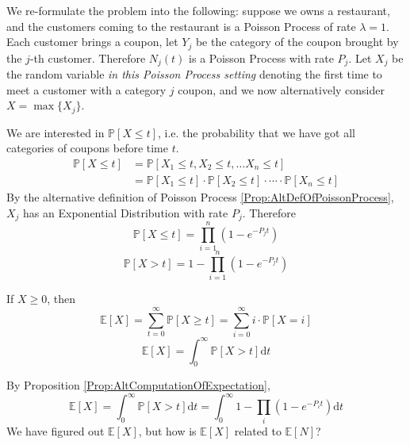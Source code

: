         We re-formulate the problem into the following: suppose we owns a restaurant, and the customers coming to the restaurant is a Poisson Process of rate $\lambda = 1$. Each customer brings a coupon, let $Y_j$ be the category of the coupon brought by the $j$-th customer. Therefore $N_j(t)$ is a Poisson Process with rate $P_j$. Let $X_j$ be the random variable \emph{in this Poisson Process setting} denoting the first time to meet a customer with a category $j$ coupon, and we now alternatively consider $X = \max \{X_j\}$.

        We are interested in $\mathbb{P}[X \le t]$, i.e. the probability that we have got all categories of coupons before time $t$.
        \begin{align*}
            \mathbb{P}[X \le t] &= \mathbb{P}[X_1 \le t, X_2 \le t, \dots X_n \le t]\\
            &= \mathbb{P}[X_1 \le t] \cdot \mathbb{P}[X_2 \le t] \cdot \cdots \cdot \mathbb{P}[X_n \le t]
        \end{align*}
        By the alternative definition of Poisson Process \ref{Prop:AltDefOfPoissonProcess}, $X_j$ has an Exponential Distribution with rate $P_j$. Therefore
        \[ \mathbb{P}[X \le t] = \prod_{i=1}^n (1-e^{-P_jt}) \]
        \[ \mathbb{P}[X > t] = 1 - \prod_{i=1}^n (1-e^{-P_jt}) \]
        \begin{proposition}\label{Prop:AltComputationOfExpectation}
            If $X \ge 0$, then
            \[ \mathbb{E}[X] = \sum_{t=0}^{\infty} \mathbb{P}[X \ge t] = \sum_{i=0}^{\infty}i\cdot\mathbb{P}[X=i] \]
            \[ \mathbb{E}[X] = \int_0^{\infty} \mathbb{P}[X > t]\mathrm{d}t\]
        \end{proposition}
        By Proposition \ref{Prop:AltComputationOfExpectation},
        \[ \mathbb{E}[X] = \int_0^{\infty} \mathbb{P}[X > t]\mathrm{d}t = \int_0^{\infty}1 - \prod_i (1-e^{-P_it})\mathrm{d}t \]
        We have figured out $\mathbb{E}[X]$, but how is $\mathbb{E}[X]$ related to $\mathbb{E}[N]$?

